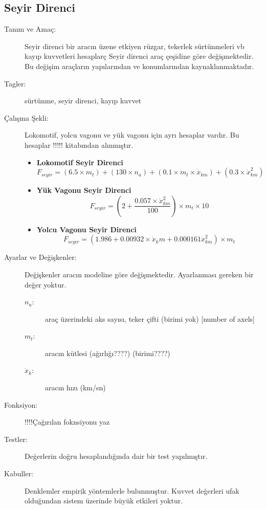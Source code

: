 \documentclass[10pt,a4paper]{article}
\begin{document}
\subsection{Seyir Direnci}
\begin{description}

\item[Tanım ve Amaç:] Seyir direnci bir aracın üzene etkiyen rüzgar, tekerlek sürtünmeleri vb kayıp kuvvetleri hesaplarç Seyir direnci araç çeşidine göre değişmektedir. Bu değişim araçların yapılarından ve konumlarından kaynaklanmaktadır. 

\item[Tagler:] sürtünme, seyir direnci, kayıp kuvvet

\item[Çalışma Şekli:] Lokomotif, yolcu vagonu ve yük vagonu için ayrı hesaplar vardır. Bu hesaplar !!!!! kitabından alınmıştır. 

\begin{itemize}
\item \textbf{Lokomotif Seyir Direnci}
\begin{equation}
F_{seyir} = (6.5 \times m_t) + (130 \times n_a) + (0.1 \times m_t \times \dot{x}_{km}) + (0.3 \times \dot{x}^2_{km})
\end{equation}

\item \textbf{Yük Vagonu Seyir Direnci}
\begin{equation}
F_{seyir} = (2 + \dfrac{0.057 \times \dot{x}^2_{km} }{100})\times m_t \times 10
\end{equation}

\item \textbf{Yolcu Vagonu Seyir Direnci}
\begin{equation}
F_{seyir} = (1.986 + 0.00932 \times \dot{x}_km + 0.000161 \dot{x}^2_{km}) \times m_t
\end{equation}
\end{itemize}

\item[Ayarlar ve Değişkenler:] Değişkenler aracın modeline göre değişmektedir. Ayarlanması gereken bir değer yoktur.
\begin{description}
\item[$n_a$:]araç üzerindeki aks sayısı, teker çifti (birimi yok) [number of axels]
\item[$m_t$:]aracın kütlesi (ağırlığı????) (birimi????)
\item[$\dot{x}_k$:] aracın hızı (km/sn)
\end{description}

\item[Fonksiyon:]!!!!Çağırılan foknsiyonu yaz

\item[Testler:]Değerlerin doğru hesaplandığında dair bir test yapılmıştır.

\item[Kabuller:]Denklemler empirik yöntemlerle bulunmuştur. Kuvvet değerleri ufak olduğundan sistem üzerinde büyük etkileri yoktur. 

\end{description}
\newpage
\end{document}
